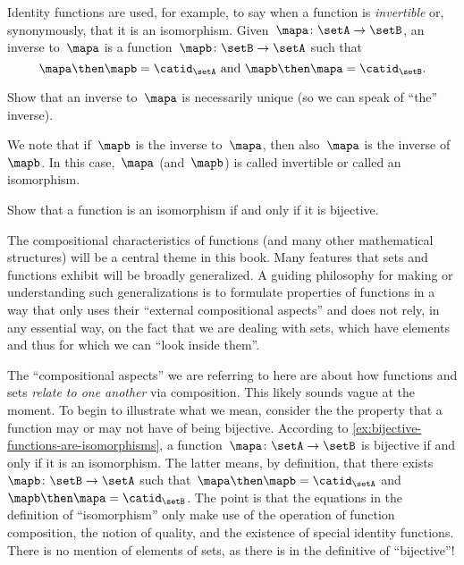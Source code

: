 Identity functions are used, for example, to say when a function is \emph{invertible} or, synonymously, that it is an isomorphism.
Given~$\mapa \colon \setA \to \setB$, an inverse to~$\mapa$ is a function~$\mapb \colon \setB \to \setA$ such that
\begin{equation}\label{eq:isomorphism-equations}
\mapa \then \mapb = \catid_\setA \text{ and }  \mapb \then \mapa = \catid_\setB.
\end{equation}


\begin{exercise}
Show that an inverse to~$\mapa$ is necessarily unique (so we can speak of ``the'' inverse).
\end{exercise}
\begin{solution}
    \end{solution}
We note that if~$\mapb$ is the inverse to~$\mapa$, then also~$\mapa$ is the inverse of~$\mapb$.
In this case,~$\mapa$ (and~$\mapb$) is called invertible or called an isomorphism.

\begin{exercise}\label{ex:bijective-functions-are-isomorphisms}
Show that a function is an isomorphism if and only if it is bijective.
\end{exercise}
\begin{solution}
    \end{solution}

The compositional characteristics of functions (and many other mathematical structures) will be a central theme in this book.
Many features that sets and functions exhibit will be broadly generalized.
A guiding philosophy for making or understanding such generalizations is to formulate properties of functions in a way that only uses their ``external compositional aspects'' and does not rely, in any essential way, on the fact that we are dealing with sets, which have elements and thus for which we can ``look inside them''.

The ``compositional aspects'' we are referring to here are about how functions and sets \emph{relate to one another} via composition.
This likely sounds vague at the moment.
To begin to illustrate what we mean, consider the the property that a function may or may not have of being bijective.
According to \cref{ex:bijective-functions-are-isomorphisms}, a function~$\mapa\colon \setA \to \setB$ is bijective if and only if it is an isomorphism.
The latter means, by definition, that there exists~$\mapb \colon \setB \to \setA$ such that~$\mapa \then \mapb = \catid_\setA$ and~$\mapb \then \mapa = \catid_\setB$.
The point is that the equations in the definition of ``isomorphism'' only make use of the operation of function composition, the notion of quality, and the existence of special identity functions.
There is no mention of elements of sets, as there is in the definitive of ``bijective''!

